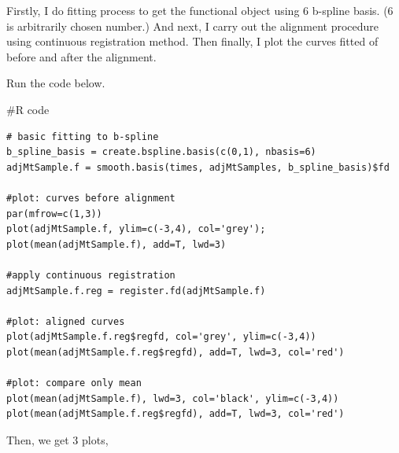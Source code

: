 \documentclass{article}
\newenvironment{Rcode}%
{%
    \begin{mdframed}
    \#R code
    \begin{small}
}
{%
    \end{small}
    \end{mdframed}
}
\begin{document}
Firstly, I do fitting process to get the functional object using 6 b-spline basis. (6 is arbitrarily chosen number.)
And next, I carry out the alignment procedure using continuous registration method.
Then finally, I plot the curves fitted of before and after the alignment.

Run the code below.
\begin{Rcode}
    \begin{verbatim}
# basic fitting to b-spline
b_spline_basis = create.bspline.basis(c(0,1), nbasis=6)
adjMtSample.f = smooth.basis(times, adjMtSamples, b_spline_basis)$fd

#plot: curves before alignment
par(mfrow=c(1,3))
plot(adjMtSample.f, ylim=c(-3,4), col='grey'); plot(mean(adjMtSample.f), add=T, lwd=3)

#apply continuous registration
adjMtSample.f.reg = register.fd(adjMtSample.f)

#plot: aligned curves
plot(adjMtSample.f.reg$regfd, col='grey', ylim=c(-3,4))
plot(mean(adjMtSample.f.reg$regfd), add=T, lwd=3, col='red')

#plot: compare only mean
plot(mean(adjMtSample.f), lwd=3, col='black', ylim=c(-3,4))
plot(mean(adjMtSample.f.reg$regfd), add=T, lwd=3, col='red')
    \end{verbatim}
\end{Rcode}

\newpage
Then, we get 3 plots,
\end{document}
